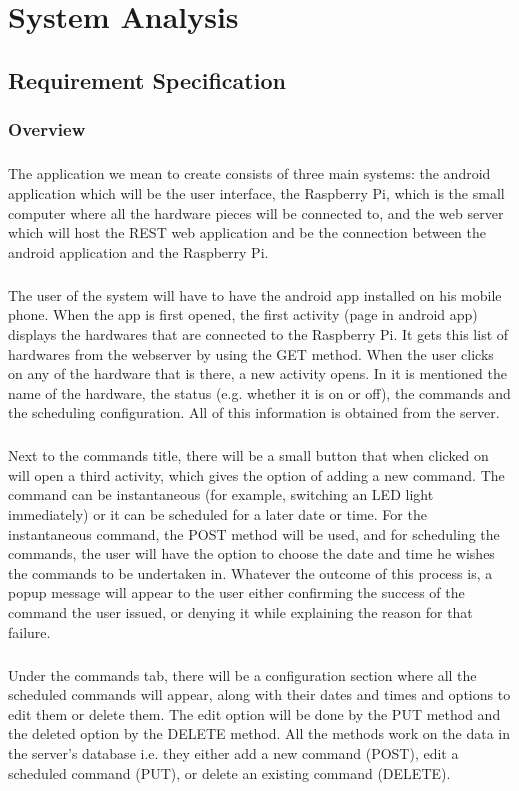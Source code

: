 \documentclass[12pt, oneside, a4paper]{book}
\newcommand{\mychapter}[1]{\newpage%
	\thispagestyle{empty}
	\topskip0pt%
	\vspace*{\fill}%
	\addtocounter{chapter}{1}%
	\begin{center}%
		\textbf{\Large{\color{chapter}{CHAPTER NO. \thechapter \\ \uppercase{#1}}}}%
	\end{center}%
	\vspace*{\fill}%
	\addtocounter{chapter}{-1}
	\newpage%
	\chapter{#1}
}
\begin{document}
	\mychapter{System Analysis}
		\section{Requirement Specification}
			\subsection{Overview}
				\paragraph{} The application we mean to create consists of three main systems: the android application which will be the user interface, the Raspberry Pi, which is the small computer where all the hardware pieces will be connected to, and the web server which will host the REST web application and be the connection between the android application and the Raspberry Pi.
				\paragraph{}The user of the system will have to have the android app installed on his mobile phone. When the app is first opened, the first activity (page in android app) displays the hardwares that are connected to the Raspberry Pi. It gets this list of hardwares from the webserver by using the GET method. When the user clicks on any of the hardware that is there, a new activity opens. In it is mentioned the name of the hardware, the status (e.g. whether it is on or off), the commands and the scheduling configuration. All of this information is obtained from the server. 
				\paragraph{}Next to the commands title, there will be a small button that when clicked on will open a third activity, which gives the option of adding a new command. The command can be instantaneous (for example, switching an LED light immediately) or it can be scheduled for a later date or time. For the instantaneous command, the POST method will be used, and for scheduling the commands, the user will have the option to choose the date and time he wishes the commands to be undertaken in. Whatever the outcome of this process is, a popup message will appear to the user either confirming the success of the command the user issued, or denying it while explaining the reason for that failure.
				\paragraph{}Under the commands tab, there will be a  configuration 	section where all the scheduled commands will appear, along with their dates and times and options to edit them or delete them. The edit option will be done by the PUT method and the deleted option by the DELETE method. All the methods work on the data in the server’s database i.e. they either add a new command (POST), edit a scheduled command (PUT), or delete an existing command (DELETE). 
\end{document}
